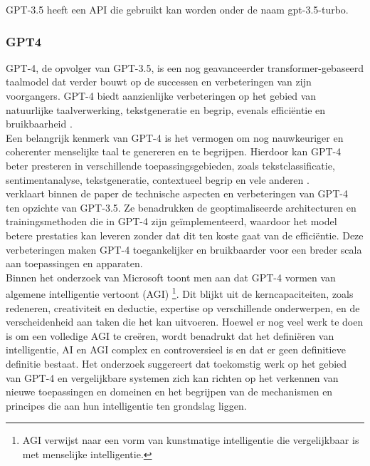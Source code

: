 GPT-3.5 heeft een API die gebruikt kan worden onder de naam gpt-3.5-turbo. 

\subsubsection{GPT4}
GPT-4, de opvolger van GPT-3.5, is een nog geavanceerder transformer-gebaseerd taalmodel dat verder bouwt op de successen en verbeteringen van zijn voorgangers. GPT-4 biedt aanzienlijke verbeteringen op het gebied van natuurlijke taalverwerking, tekstgeneratie en begrip, evenals efficiëntie en bruikbaarheid \autocite{gpt_openai, gpt_micai}. \\

Een belangrijk kenmerk van GPT-4 is het vermogen om nog nauwkeuriger en coherenter menselijke taal te genereren en te begrijpen. Hierdoor kan GPT-4 beter presteren in verschillende toepassingsgebieden, zoals tekstclassificatie, sentimentanalyse, tekstgeneratie, contextueel begrip en vele anderen \autocite{gpt_micai}. \\

\textcite{gpt_cn} verklaart binnen de paper de technische aspecten en verbeteringen van GPT-4 ten opzichte van GPT-3.5. Ze benadrukken de geoptimaliseerde architecturen en trainingsmethoden die in GPT-4 zijn geïmplementeerd, waardoor het model betere prestaties kan leveren zonder dat dit ten koste gaat van de efficiëntie. Deze verbeteringen maken GPT-4 toegankelijker en bruikbaarder voor een breder scala aan toepassingen en apparaten. \\

Binnen het onderzoek van Microsoft \textcite{gpt_micai} toont men aan dat GPT-4 vormen van algemene intelligentie vertoont (AGI) \footnote{AGI verwijst naar een vorm van kunstmatige intelligentie die vergelijkbaar is met menselijke intelligentie.}. Dit blijkt uit de kerncapaciteiten, zoals redeneren, creativiteit en deductie, expertise op verschillende onderwerpen, en de verscheidenheid aan taken die het kan uitvoeren. Hoewel er nog veel werk te doen is om een volledige AGI te creëren, wordt benadrukt dat het definiëren van intelligentie, AI en AGI complex en controversieel is en dat er geen definitieve definitie bestaat. Het onderzoek suggereert dat toekomstig werk op het gebied van GPT-4 en vergelijkbare systemen zich kan richten op het verkennen van nieuwe toepassingen en domeinen en het begrijpen van de mechanismen en principes die aan hun intelligentie ten grondslag liggen. \\


